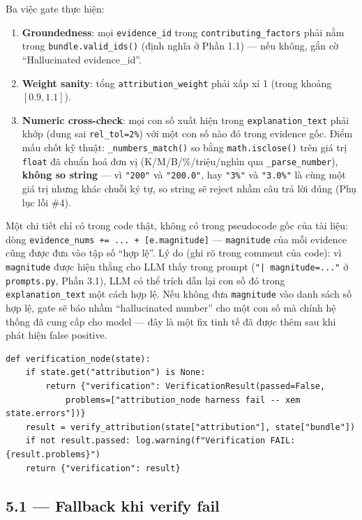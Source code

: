 \documentclass[12pt,a4paper]{article}
\begin{document}
Ba việc gate thực hiện:
\begin{enumerate}[leftmargin=1.6em]
    \item \textbf{Groundedness}: mọi \texttt{evidence\_id} trong \texttt{contributing\_factors}
    phải nằm trong \texttt{bundle.valid\_ids()} (định nghĩa ở Phần 1.1) --- nếu không, gắn cờ
    ``Hallucinated evidence\_id''.
    \item \textbf{Weight sanity}: tổng \texttt{attribution\_weight} phải xấp xỉ 1 (trong khoảng
    $[0.9, 1.1]$).
    \item \textbf{Numeric cross-check}: mọi con số xuất hiện trong \texttt{explanation\_text} phải
    khớp (dung sai \texttt{rel\_tol=2\%}) với một con số nào đó trong evidence gốc. Điểm mấu chốt
    kỹ thuật: \texttt{\_numbers\_match()} so bằng \texttt{math.isclose()} trên giá trị \texttt{float}
    đã chuẩn hoá đơn vị (K/M/B/\%/triệu/nghìn qua \texttt{\_parse\_number}), \textbf{không so
    string} --- vì \texttt{"200"} và \texttt{"200.0"}, hay \texttt{"3\%"} và \texttt{"3.0\%"} là
    cùng một giá trị nhưng khác chuỗi ký tự, so string sẽ reject nhầm câu trả lời đúng (Phụ lục
    lỗi \#4).
\end{enumerate}

Một chi tiết chỉ có trong code thật, không có trong pseudocode gốc của tài liệu: dòng
\texttt{evidence\_nums += ... + [e.magnitude]} --- \texttt{magnitude} của mỗi evidence cũng được
đưa vào tập số ``hợp lệ''. Lý do (ghi rõ trong comment của code): vì \texttt{magnitude} được hiện
thẳng cho LLM thấy trong prompt (\texttt{"| magnitude=..."} ở \texttt{prompts.py}, Phần 3.1), LLM
có thể trích dẫn lại con số đó trong \texttt{explanation\_text} một cách hợp lệ. Nếu không đưa
\texttt{magnitude} vào danh sách số hợp lệ, gate sẽ báo nhầm ``hallucinated number'' cho một con
số mà chính hệ thống đã cung cấp cho model --- đây là một fix tinh tế đã được thêm sau khi phát
hiện false positive.

\begin{lstlisting}
def verification_node(state):
    if state.get("attribution") is None:
        return {"verification": VerificationResult(passed=False,
            problems=["attribution_node harness fail -- xem state.errors"])}
    result = verify_attribution(state["attribution"], state["bundle"])
    if not result.passed: log.warning(f"Verification FAIL: {result.problems}")
    return {"verification": result}
\end{lstlisting}

\subsection{5.1 --- Fallback khi verify fail}
\end{document}
